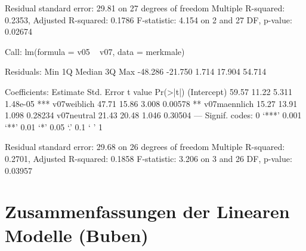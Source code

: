 \begin{Schunk}
\begin{Soutput}
Residual standard error: 29.81 on 27 degrees of freedom
Multiple R-squared: 0.2353,	Adjusted R-squared: 0.1786 
F-statistic: 4.154 on 2 and 27 DF,  p-value: 0.02674 
\end{Soutput}
\begin{Soutput}
Call:
lm(formula = v05 ~ v07, data = merkmale)

Residuals:
    Min      1Q  Median      3Q     Max 
-48.286 -21.750   1.714  17.904  54.714 

Coefficients:
             Estimate Std. Error t value Pr(>|t|)    
(Intercept)     59.57      11.22   5.311 1.48e-05 ***
v07weiblich     47.71      15.86   3.008  0.00578 ** 
v07maennlich    15.27      13.91   1.098  0.28234    
v07neutral      21.43      20.48   1.046  0.30504    
---
Signif. codes:  0 ‘***’ 0.001 ‘**’ 0.01 ‘*’ 0.05 ‘.’ 0.1 ‘ ’ 1 

Residual standard error: 29.68 on 26 degrees of freedom
Multiple R-squared: 0.2701,	Adjusted R-squared: 0.1858 
F-statistic: 3.206 on 3 and 26 DF,  p-value: 0.03957 
\end{Soutput}
\end{Schunk}




\section{Zusammenfassungen der Linearen Modelle (Buben)}

